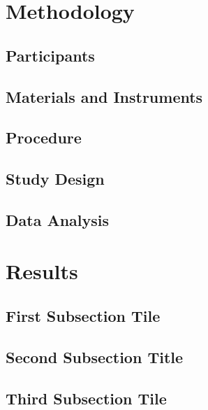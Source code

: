 \documentclass[12pt]{article}
\begin{document}
\begin{spacing}{1.5}
\newpage
\section{Methodology}


\subsection{Participants}


\subsection{Materials and Instruments}


\subsection{Procedure}


\subsection{Study Design}


\subsection{Data Analysis}

\bigskip



\newpage
\section{Results}


\subsection{First Subsection Tile}


\subsection{Second Subsection Title}


\subsection{Third Subsection Tile}

\bigskip




\end{spacing}
\end{document}
